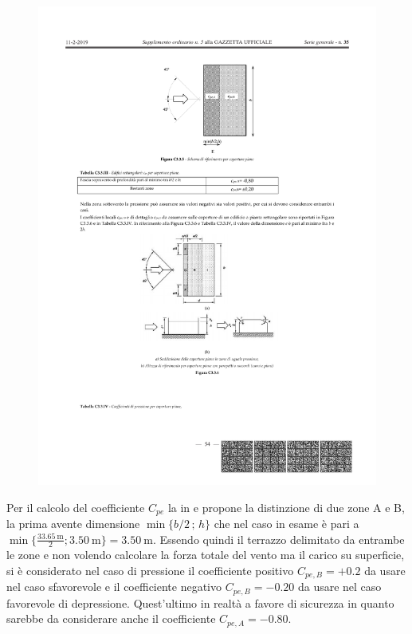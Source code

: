 \begin{figure}[htbp]
\centering
\includegraphics{IMG/figC3-3-5.pdf}
\label{fig:C335}
\end{figure}
Per il calcolo del coefficiente $C_{pe}$ la  in  e  propone la distinzione di due zone A e B, la prima avente dimensione $\min\{ b/2\,;\,h\}$ che nel caso in esame è pari a $\min\{\frac{\SI{33.65}{\meter}}{2};\SI{3.50}{\meter}\}=\SI{3.50}{\meter}$.
Essendo quindi il terrazzo delimitato da entrambe le zone e non volendo calcolare la forza totale del vento ma il carico su superficie, si è considerato nel caso di pressione il coefficiente positivo $C_{pe,B}=+0.2$ da usare nel caso sfavorevole e il coefficiente negativo $C_{pe,B}=-0.20$ da usare nel caso favorevole di depressione.
Quest'ultimo in realtà a favore di sicurezza in quanto sarebbe da considerare anche il coefficiente $C_{pe,A}=-0.80$.

